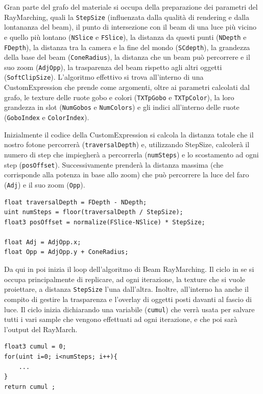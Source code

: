 \documentclass[main.tex]{subfiles}
\begin{document}
Gran parte del grafo del materiale si occupa della preparazione dei parametri del RayMarching, quali la \lstinline{StepSize} (influenzata dalla qualità di rendering e dalla lontananza del beam), il punto di intersezione con il beam di una luce più vicino e quello più lontano (\lstinline{NSlice} e \lstinline{FSlice}), la distanza da questi punti (\lstinline{NDepth} e \lstinline{FDepth}), la distanza tra la camera e la fine del mondo (\lstinline{SCdepth}), la grandezza della base del beam (\lstinline{ConeRadius}), la distanza che un beam può percorrere e il suo zoom (\lstinline{AdjOpp}), la trasparenza del beam rispetto agli altri oggetti (\lstinline{SoftClipSize}). L'algoritmo effettivo si trova all'interno di una CustomExpression che prende come argomenti, oltre ai parametri calcolati dal grafo, le texture delle ruote gobo e colori (\lstinline{TXTpGobo} e \lstinline{TXTpColor}), la loro grandezza in slot (\lstinline{NumGobos} e \lstinline{NumColors}) e gli indici all'interno delle ruote (\lstinline{GoboIndex} e \lstinline{ColorIndex}). \newline

Inizialmente il codice della CustomExpression si calcola la distanza totale che il nostro fotone percorrerà (\lstinline{traversalDepth}) e, utilizzando StepSize, calcolerà il numero di step che impiegherà a percorrerla (\lstinline{numSteps}) e lo scostamento ad ogni step (\lstinline{posOffset}). Successivamente prenderà la distanza massima (che corrisponde alla potenza in base allo zoom) che può percorrere la luce del faro (\lstinline{Adj}) e il suo zoom (\lstinline{Opp}).
\lstset{language=glsl}
\begin{lstlisting}
float traversalDepth = FDepth - NDepth;
uint numSteps = floor(traversalDepth / StepSize);
float3 posOffset = normalize(FSlice-NSlice) * StepSize;

float Adj = AdjOpp.x;
float Opp = AdjOpp.y + ConeRadius;
\end{lstlisting}

Da qui in poi inizia il loop dell'algoritmo di Beam RayMarching. Il ciclo in se si occupa principalmente di replicare, ad ogni iterazione, la texture che si vuole proiettare, a distanza \lstinline{StepSize} l'una dall'altra. Inoltre, all'interno ha anche il compito di gestire la trasparenza e l'overlay di oggetti posti davanti al fascio di luce. Il ciclo inizia dichiarando una variabile (\lstinline{cumul}) che verrà usata per salvare tutti i vari sample che vengono effettuati ad ogni iterazione, e che poi sarà l'output del RayMarch.
\begin{lstlisting}
float3 cumul = 0;
for(uint i=0; i<numSteps; i++){
    ...
}
return cumul ;
\end{lstlisting}
\end{document}
